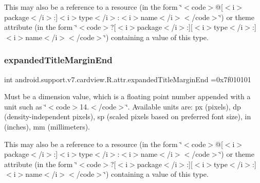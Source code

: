 This may also be a reference to a resource (in the form \char`\"{}$<$code$>$@\mbox{[}$<$i$>$package$<$/i$>$\+:\mbox{]}$<$i$>$type$<$/i$>$\+:$<$i$>$name$<$/i$>$$<$/code$>$\char`\"{}) or theme attribute (in the form \char`\"{}$<$code$>$?\mbox{[}$<$i$>$package$<$/i$>$\+:\mbox{]}\mbox{[}$<$i$>$type$<$/i$>$\+:\mbox{]}$<$i$>$name$<$/i$>$$<$/code$>$\char`\"{}) containing a value of this type. \mbox{\label{classandroid_1_1support_1_1v7_1_1cardview_1_1R_1_1attr_a10240d18a9a9b1a56ef4e7a06d966013}} 
\subsubsection{\texorpdfstring{expanded\+Title\+Margin\+End}{expandedTitleMarginEnd}}
{\footnotesize\ttfamily int android.\+support.\+v7.\+cardview.\+R.\+attr.\+expanded\+Title\+Margin\+End =0x7f010101\hspace{0.3cm}{\ttfamily [static]}}

Must be a dimension value, which is a floating point number appended with a unit such as \char`\"{}$<$code$>$14.\+5sp$<$/code$>$\char`\"{}. Available units are\+: px (pixels), dp (density-\/independent pixels), sp (scaled pixels based on preferred font size), in (inches), mm (millimeters). 

This may also be a reference to a resource (in the form \char`\"{}$<$code$>$@\mbox{[}$<$i$>$package$<$/i$>$\+:\mbox{]}$<$i$>$type$<$/i$>$\+:$<$i$>$name$<$/i$>$$<$/code$>$\char`\"{}) or theme attribute (in the form \char`\"{}$<$code$>$?\mbox{[}$<$i$>$package$<$/i$>$\+:\mbox{]}\mbox{[}$<$i$>$type$<$/i$>$\+:\mbox{]}$<$i$>$name$<$/i$>$$<$/code$>$\char`\"{}) containing a value of this type. \mbox{\label{classandroid_1_1support_1_1v7_1_1cardview_1_1R_1_1attr_a962000eea280327317fca819ae6f778a}} 
